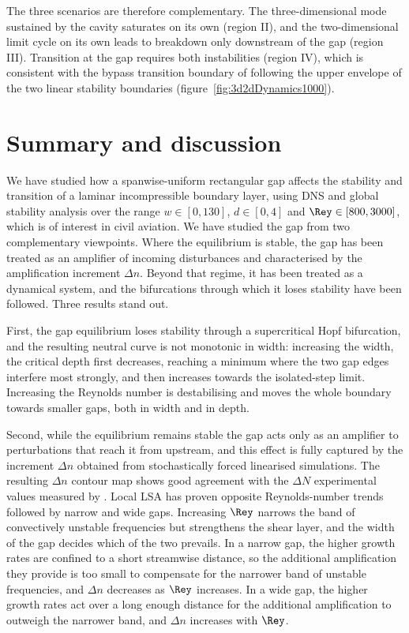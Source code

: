 \documentclass[lineno]{jfm}
\begin{document}
The three scenarios are therefore complementary. The three-dimensional mode sustained by the cavity saturates on its own (region II), and the two-dimensional limit cycle on its own leads to breakdown only downstream of the gap (region III). Transition at the gap requires both instabilities (region IV), which is consistent with the bypass transition boundary of \citet{jeffGaps} following the upper envelope of the two linear stability boundaries (figure~\ref{fig:3d2dDynamics1000}).

\section{Summary and discussion}\label{sec:conclusions}
We have studied how a spanwise-uniform rectangular gap affects the stability and transition of a laminar incompressible boundary layer, using \ac{DNS} and global stability analysis over the range $w\in[0,130]$, $d\in[0,4]$ and $\Rey\in[800,3000]$, which is of interest in civil aviation. We have studied the gap from two complementary viewpoints. Where the equilibrium is stable, the gap has been treated as an amplifier of incoming disturbances and characterised by the amplification increment $\Delta n$. Beyond that regime, it has been treated as a dynamical system, and the bifurcations through which it loses stability have been followed. Three results stand out.

First, the gap equilibrium loses stability through a supercritical Hopf bifurcation, and the resulting neutral curve is not monotonic in width: increasing the width, the critical depth first decreases, reaching a minimum where the two gap edges interfere most strongly, and then increases towards the isolated-step limit. Increasing the Reynolds number is destabilising and moves the whole boundary towards smaller gaps, both in width and in depth.

Second, while the equilibrium remains stable the gap acts only as an amplifier to perturbations that reach it from upstream, and this effect is fully captured by the increment $\Delta n$ obtained from stochastically forced linearised simulations. The resulting $\Delta n$ contour map shows good agreement with the $\Delta N$ experimental values measured by \citet{jeffGaps}. Local \ac{LSA} has proven opposite Reynolds-number trends followed by narrow and wide gaps. Increasing $\Rey$ narrows the band of convectively unstable frequencies but strengthens the shear layer, and the width of the gap decides which of the two prevails. In a narrow gap, the higher growth rates are confined to a short streamwise distance, so the additional amplification they provide is too small to compensate for the narrower band of unstable frequencies, and $\Delta n$ decreases as $\Rey$ increases. In a wide gap, the higher growth rates act over a long enough distance for the additional amplification to outweigh the narrower band, and $\Delta n$ increases with $\Rey$.
\end{document}
